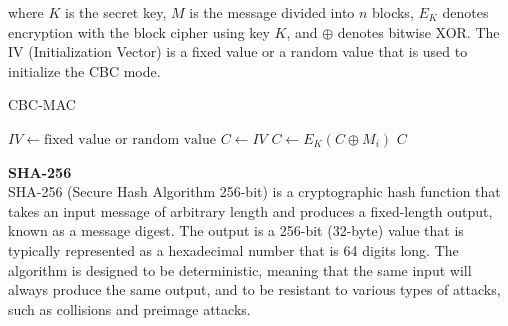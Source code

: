 \documentclass[11pt]{article}
\begin{document}
where $K$ is the secret key, $M$ is the message divided into $n$ blocks, $E_K$ denotes encryption with the block cipher using key $K$, and $\oplus$ denotes bitwise XOR. The IV (Initialization Vector) is a fixed value or a random value that is used to initialize the CBC mode.
\begin{algorithm}
\caption{CBC-MAC}
\begin{algorithmic}[1]
\State $IV \gets \text{fixed value or random value}$
\State $C \gets IV$
\State $C \gets E_K(C \oplus M_i)$
\EndFor
\State \Return $C$
\EndProcedure
\end{algorithmic}
\end{algorithm}
\textbf{SHA-256}\\
SHA-256 (Secure Hash Algorithm 256-bit) is a cryptographic hash function that takes an input message of arbitrary length and produces a fixed-length output, known as a message digest. The output is a 256-bit (32-byte) value that is typically represented as a hexadecimal number that is 64 digits long. The algorithm is designed to be deterministic, meaning that the same input will always produce the same output, and to be resistant to various types of attacks, such as collisions and preimage attacks.\\
\end{document}

